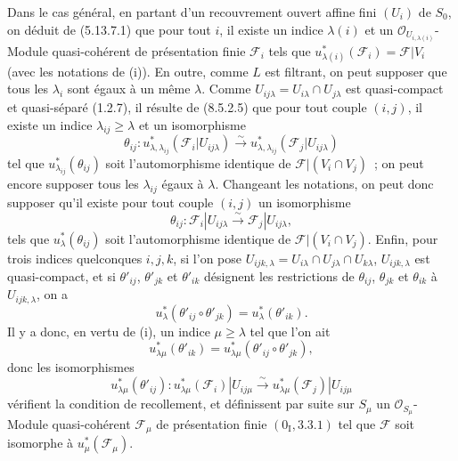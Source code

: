 Dans le cas général, en partant d'un recouvrement ouvert affine fini $(U_i)$
de $S_0$, on déduit de (5.13.7.1) que pour tout $i$, il existe un indice
$\lambda(i)$ et un $\mathcal O_{U_{i,\lambda(i)}}$-Module quasi-cohérent de
présentation finie $\mathcal F_i$ tels que
$u_{\lambda(i)}^*(\mathcal F_i)=\mathcal F|V_i$ (avec les notations de (i)). En
outre, comme $L$ est filtrant, on peut supposer que tous les $\lambda_i$ sont
égaux à un même $\lambda$. Comme
$U_{ij\lambda}=U_{i\lambda}\cap U_{j\lambda}$ est quasi-compact et
quasi-séparé (1.2.7), il résulte de (8.5.2.5) que pour tout couple $(i,j)$, il
existe un indice $\lambda_{ij}\geq\lambda$ et un isomorphisme
\[
  \theta_{ij}:u_{\lambda,\lambda_{ij}}^*(\mathcal F_i|U_{ij\lambda})
  \xrightarrow{\sim}
  u_{\lambda,\lambda_{ij}}^*(\mathcal F_j|U_{ij\lambda})
\]
tel que $u_{\lambda_{ij}}^*(\theta_{ij})$ soit l'automorphisme identique de
$\mathcal F|(V_i\cap V_j)$~; on peut encore supposer tous les
$\lambda_{ij}$ égaux à $\lambda$. Changeant les notations, on peut donc
supposer qu'il existe pour tout couple $(i,j)$ un isomorphisme
\[
  \theta_{ij}:\mathcal F_i|U_{ij\lambda}
  \xrightarrow{\sim}\mathcal F_j|U_{ij\lambda},
\]
tels que $u_\lambda^*(\theta_{ij})$ soit l'automorphisme identique de
$\mathcal F|(V_i\cap V_j)$. Enfin, pour trois indices quelconques $i,j,k$, si
l'on pose
$U_{ijk,\lambda}=U_{i\lambda}\cap U_{j\lambda}\cap U_{k\lambda}$,
$U_{ijk,\lambda}$ est quasi-compact, et si $\theta'_{ij}$, $\theta'_{jk}$ et
$\theta'_{ik}$ désignent les restrictions de $\theta_{ij}$, $\theta_{jk}$ et
$\theta_{ik}$ à $U_{ijk,\lambda}$, on a
\[
  u_\lambda^*(\theta'_{ij}\circ\theta'_{jk})=u_\lambda^*(\theta'_{ik}).
\]
Il y a donc, en vertu de (i), un indice $\mu\geq\lambda$ tel que l'on ait
\[
  u_{\lambda\mu}^*(\theta'_{ik})
  =u_{\lambda\mu}^*(\theta'_{ij}\circ\theta'_{jk}),
\]
donc les isomorphismes
\[
  u_{\lambda\mu}^*(\theta'_{ij}):
  u_{\lambda\mu}^*(\mathcal F_i)|U_{ij\mu}
  \xrightarrow{\sim}
  u_{\lambda\mu}^*(\mathcal F_j)|U_{ij\mu}
\]
vérifient la condition de recollement, et définissent par suite sur $S_\mu$ un
$\mathcal O_{S_\mu}$-Module quasi-cohérent $\mathcal F_\mu$ de présentation
finie $(0_{\mathrm I},3.3.1)$ tel que $\mathcal F$ soit isomorphe à
$u_\mu^*(\mathcal F_\mu)$.

